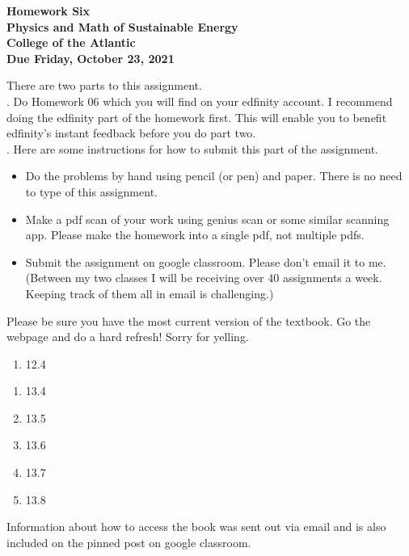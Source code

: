\documentclass[12pt]{article}
\begin{document}
\pagestyle{empty}
 
\begin{center}
{\LARGE {\bf Homework Six}}\\
\bigskip
{\Large {\bf Physics and Math of Sustainable Energy}}\\
\bigskip
{\Large {\bf College of the Atlantic}}\\
\bigskip
{ {\bf Due Friday, October 23, 2021}}\\ 
\end{center}
\medskip


\noindent There are two parts to this assignment.\\

.  Do Homework 06 which you will find
on your edfinity account.  I recommend doing the edfinity part of the
homework first.  This will enable you to benefit edfinity's instant
feedback before you do part two.\\


.  Here are some
instructions for how to submit this part of the assignment.
\begin{itemize}
\item Do the problems by hand using pencil (or pen) and paper.
  There is no need to type of this assignment.
\item Make a pdf scan of your work using genius scan or some
  similar scanning app.  Please make the homework into a single
  pdf, not multiple pdfs.
\item Submit the assignment on google classroom.  Please don't
  email it to me.  (Between my two classes I will be receiving
  over 40 assignments a week.  Keeping track of them all in email
  is challenging.)\\
\end{itemize}


  Please be sure you have the most
current version of the textbook.  Go the webpage and do a hard
refresh!  Sorry for yelling.\\ 

\begin{enumerate}
\setlength{\itemsep}{-1mm}
\item 12.4\\
\end{enumerate}

\begin{enumerate}
\setlength{\itemsep}{-1mm}
\item 13.4
\item 13.5
\item 13.6
\item 13.7
\item 13.8\\
\end{enumerate}

\noindent Information about how to access the book was sent out
via email and is also included on the pinned post on google
classroom. 
\end{document}
